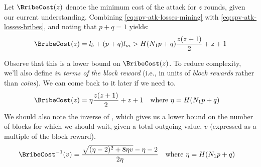 
Let $\BribeCost(z)$ denote the minimum cost of the attack for $z$ rounds, given our current understanding.
Combining \autoref{eq:spv-atk-losses-mining} with \autoref{eq:spv-atk-losses-bribes}, and noting that $p+q=1$ yields:
\begin{equation}
    \BribeCost(z)= l_b + (p+q)l_m > H (N_1 p + q) \frac{z(z+1)}{2} + z + 1
    \label{eq:spv-atk-losses-total}
\end{equation}


Observe that this is a lower bound on $\BribeCost(z)$.
To reduce complexity, we'll also define \BribeCost \emph{in terms of the block reward} (i.e., in units of \emph{block rewards} rather than \emph{coins}).
We can come back to it later if we need to.
\begin{align}
    \BribeCost(z) &= \eta \frac{z(z+1)}{2} + z + 1
        & & \text{where } \eta = H(N_1 p + q)
    \label{eq:spv-bribe-cost-1}
\end{align}
We should also note the inverse of \BribeCost, which gives us a lower bound on the number of blocks for which we should wait, given a total outgoing value, $v$ (expressed as a multiple of the block reward).
\begin{align}
    \BribeCost^{-1}(v) &= \frac{\sqrt{
        (\eta - 2)^2 + 8 \eta v
    } - \eta - 2}{2\eta} & & \text{where } \eta = H(N_1 p + q)
    \label{eq:spv-bribe-cost-inverse}
\end{align}

